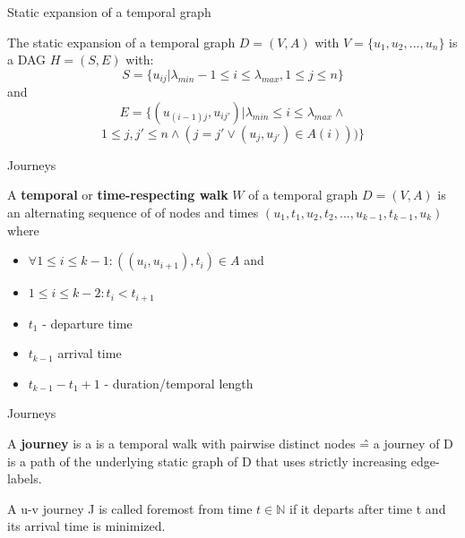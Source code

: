 \documentclass{beamer}
\begin{document}
\begin{frame}{Static expansion of a temporal graph}
  \begin{tcolorbox}[definitionstyle, title=Definition: static expansion of a graph]
    The static expansion of a temporal graph $D = (V, A)$ with $V = \{ u_1, u_2, ..., u_n \}$ is a DAG $H = (S, E)$ with:
    $$ S = \{ u_{ij} | \lambda_{min} - 1 \leq i \leq \lambda_{max}, 1 \leq j \leq n \} $$
    and
    $$ E = \{ (u_{(i - 1)j}, u_{ij'}) | \lambda_{min} \leq i \leq \lambda_{max} \land $$
    $$ 1 \leq j, j' \leq n \land (j = j' \lor (u_j, u_{j'}) \in A(i))) \} $$
  \end{tcolorbox}
\end{frame}






\begin{frame}{Journeys}
  \begin{tcolorbox}[definitionstyle, title=Definition: temporal/time respecting walk]
    A \textbf{temporal} or \textbf{time-respecting walk} $W$ of a temporal graph $D = (V, A)$ is an alternating sequence of of nodes and times $(u_1 , t_1 , u_2 , t_2 , ... , u_{k−1} , t_{k−1} , u_k )$
    where 
    \begin{itemize}
      \item $\forall 1 \leq i \leq k - 1: ((u_i , u_{i+1} ), t_i ) \in A$ and
      \item $1 \leq i \leq k − 2: t_i < t_{i + 1}$
    \end{itemize}
  \end{tcolorbox}
  \begin{itemize}
    \item $t_1$ - departure time
    \item $t_{k - 1}$ arrival time
    \item $t_{k - 1} - t_1 + 1$ - duration/temporal length
  \end{itemize}
\end{frame}

\begin{frame}{Journeys}
  \begin{tcolorbox}[definitionstyle, title=Definition: Journey]
    A \textbf{journey} is a is a temporal walk with pairwise distinct nodes \^{=} a journey of D is a path of the underlying static graph of D that uses
strictly increasing edge-labels.
  \end{tcolorbox}
  \begin{tcolorbox}[definitionstyle, title=Definition: Foremost Journey]
    A u-v journey J is called foremost from time $t \in \mathbb{N}$ if it departs after time t and its arrival time is minimized.
  \end{tcolorbox}
\end{frame}
\end{document}
